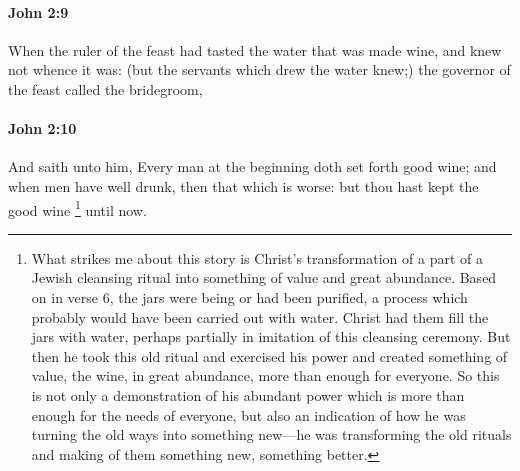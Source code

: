 		\paragraph{John 2:9} %
			\label{JOHN-2-9}

			When the ruler of the feast had tasted the water that was made wine, and knew not whence it was: (but the servants which drew the water knew;) the governor of the feast called the bridegroom,

			\begin{framed}
			\scriptsize
				\begin{compactdesc}
					\item[SBLG] 
				\end{compactdesc}
			\end{framed}

		\paragraph{John 2:10} %
			\label{JOHN-2-10}

			And saith unto him, Every man at the beginning doth set forth good wine; and when men have well drunk, then that which is worse: but thou hast kept the good wine%
				\footnote{%
					What strikes me about this story is Christ's transformation of a part of a Jewish cleansing ritual into something of value and great abundance. Based on  in verse 6, the jars were being or had been purified, a process which probably would have been carried out with water. Christ had them fill the jars with water, perhaps partially in imitation of this cleansing ceremony. But then he took this old ritual and exercised his power and created something of value, the wine, in great abundance, more than enough for everyone. So this is not only a demonstration of his abundant power which is more than enough for the needs of everyone, but also an indication of how he was turning the old ways into something new---he was transforming the old rituals and making of them something new, something better.
					}
			until now.

